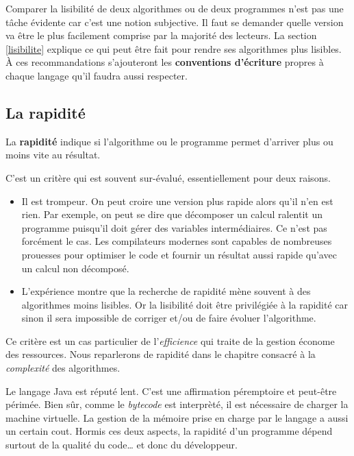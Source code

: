			Comparer la lisibilité de deux algorithmes ou de deux programmes
			n’est pas une tâche évidente car c’est une notion subjective.  Il
			faut se demander quelle version va être le plus facilement comprise
			par la majorité des lecteurs. La section \vref{lisibilite}
			explique ce qui peut être fait pour rendre ses algorithmes plus
			lisibles. À ces recommandations s'ajouteront les \textbf{conventions
			d'écriture} propres à chaque langage qu'il faudra aussi respecter. 
				
		\subsection{La rapidité}
	    
			
			La \textbf{rapidité} indique si l’algorithme ou le programme permet
			d’arriver plus ou moins vite au résultat.
			
			C’est un critère qui est souvent sur-évalué, 
			essentiellement pour deux raisons.
			\begin{itemize}
				\item 
					Il est trompeur. 
					On peut croire une version plus rapide alors qu’il n’en est rien.
					Par exemple, on peut se dire que décomposer un calcul
					ralentit un programme puisqu’il doit gérer des variables
					intermédiaires.
					Ce n’est pas forcément le cas.
					Les compilateurs modernes sont capables
					de nombreuses prouesses pour optimiser le code
					et fournir un résultat aussi rapide
					qu’avec un calcul non décomposé.
				\item
					L’expérience montre que la recherche de rapidité
					mène souvent à des algorithmes moins lisibles.
					Or la lisibilité doit être privilégiée à la rapidité
					car sinon il sera impossible de corriger et/ou
					de faire évoluer l’algorithme.
			\end{itemize}
		
			Ce critère est un cas particulier de l’\emph{efficience} qui traite
			de la gestion économe des ressources.  Nous reparlerons de rapidité
			dans le chapitre consacré à la \emph{complexité} des algorithmes.

			Le langage Java est réputé lent. C'est une affirmation péremptoire
			et peut-être périmée. Bien sûr, comme le \textit{bytecode} est
			interprèté, il est nécessaire de charger la machine virtuelle. La
			gestion de la mémoire prise en charge par le langage a aussi un
			certain cout. Hormis ces deux aspects, la rapidité d'un programme
			dépend surtout de la qualité du code… et donc du développeur.  

